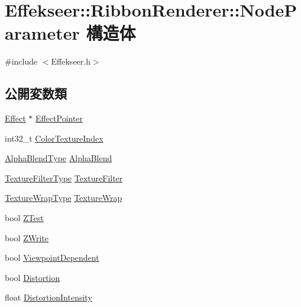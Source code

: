 \hypertarget{struct_effekseer_1_1_ribbon_renderer_1_1_node_parameter}{}\section{Effekseer\+:\+:Ribbon\+Renderer\+:\+:Node\+Parameter 構造体}
\label{struct_effekseer_1_1_ribbon_renderer_1_1_node_parameter}


{\ttfamily \#include $<$Effekseer.\+h$>$}

\subsection*{公開変数類}
\begin{DoxyCompactItemize}
\item 
\mbox{\hyperlink{class_effekseer_1_1_effect}{Effect}} $\ast$ \mbox{\hyperlink{struct_effekseer_1_1_ribbon_renderer_1_1_node_parameter_a733a9a94d376e7f26a3e85c189e18462}{Effect\+Pointer}}
\item 
int32\+\_\+t \mbox{\hyperlink{struct_effekseer_1_1_ribbon_renderer_1_1_node_parameter_a8fa40641d813533bfb6aec0d607406f2}{Color\+Texture\+Index}}
\item 
\mbox{\hyperlink{namespace_effekseer_a8c32fd5b7ec7feed73314b2ae8086949}{Alpha\+Blend\+Type}} \mbox{\hyperlink{struct_effekseer_1_1_ribbon_renderer_1_1_node_parameter_a7053fb40618f6bef7fc452a8de786959}{Alpha\+Blend}}
\item 
\mbox{\hyperlink{namespace_effekseer_ae3518502cfcb4ec4991f13c0b3e4c6ee}{Texture\+Filter\+Type}} \mbox{\hyperlink{struct_effekseer_1_1_ribbon_renderer_1_1_node_parameter_a6ed4ddc1ed71e38e017ef9ecab0b7056}{Texture\+Filter}}
\item 
\mbox{\hyperlink{namespace_effekseer_a5320c83784602974b6278bf1a77b58a3}{Texture\+Wrap\+Type}} \mbox{\hyperlink{struct_effekseer_1_1_ribbon_renderer_1_1_node_parameter_a29af7046bb166f238f41c85567bf8f66}{Texture\+Wrap}}
\item 
bool \mbox{\hyperlink{struct_effekseer_1_1_ribbon_renderer_1_1_node_parameter_afc1ba37c217130a7c6f35878f9c05fda}{Z\+Test}}
\item 
bool \mbox{\hyperlink{struct_effekseer_1_1_ribbon_renderer_1_1_node_parameter_ae19aa5b5a49a8c15136e38e4bbf1c090}{Z\+Write}}
\item 
bool \mbox{\hyperlink{struct_effekseer_1_1_ribbon_renderer_1_1_node_parameter_a64155eb858a6f7a2d0068d57ab66285e}{Viewpoint\+Dependent}}
\item 
bool \mbox{\hyperlink{struct_effekseer_1_1_ribbon_renderer_1_1_node_parameter_ae5971cdf8b9f415d536b9e920efdd219}{Distortion}}
\item 
float \mbox{\hyperlink{struct_effekseer_1_1_ribbon_renderer_1_1_node_parameter_a50d814383382197d16d213abf3341297}{Distortion\+Intensity}}
\end{DoxyCompactItemize}


